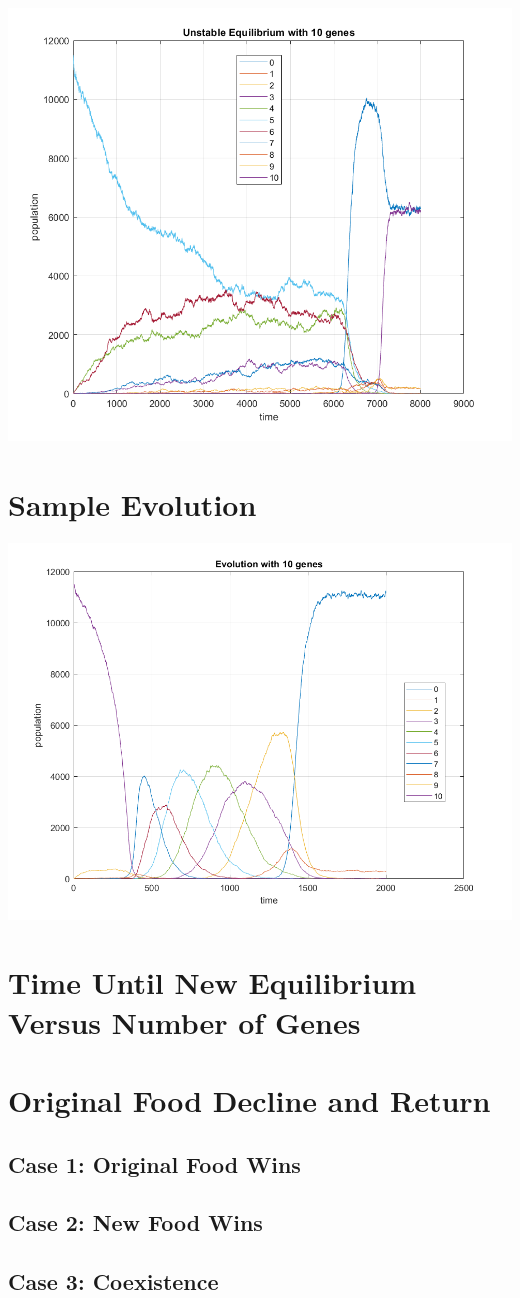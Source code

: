 \documentclass[11pt]{article}
\begin{document}
	\includegraphics[scale = .6]{unstable_equil}

\section*{Sample Evolution}

	\includegraphics[scale = .6]{evolution_ex}

\section*{Time Until New Equilibrium Versus Number of Genes}

\section*{Original Food Decline and Return}

\subsection*{Case 1: Original Food Wins}

\subsection*{Case 2: New Food Wins}

\subsection*{Case 3: Coexistence}
\end{document}
